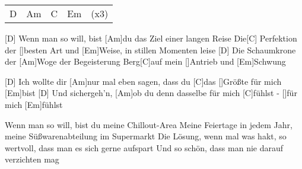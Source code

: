 

\begin{guitar}
	{\footnotesize\begin{tabular}{l|l|l|ll}
		D & Am & C \optionalChord{Cadd9} & Em & (x3)
	\end{tabular}}
	
	[D] Wenn man so will, bist [Am]du das Ziel einer langen Reise
	Die[C] Perfektion der []besten Art und [Em]Weise, in stillen Momenten leise
	[D] Die Schaumkrone der [Am]Woge der Begeisterung
	Berg[C]auf mein []Antrieb und [Em]Schwung
	
	[D] Ich wollte dir [Am]nur mal eben sagen, dass du [C]das []Größte für mich [Em]bist
	[D] Und sichergeh'n, [Am]ob du denn dasselbe für mich [C]fühlst - []für mich [Em]fühlst
	
	Wenn man so will, bist du meine Chillout-Area
	Meine Feiertage in jedem Jahr, meine Süßwarenabteilung im Supermarkt
	Die Lösung, wenn mal was hakt, so wertvoll, dass man es sich gerne aufspart
	Und so schön, dass man nie darauf verzichten mag
	
	 
	
	
	 
\end{guitar}